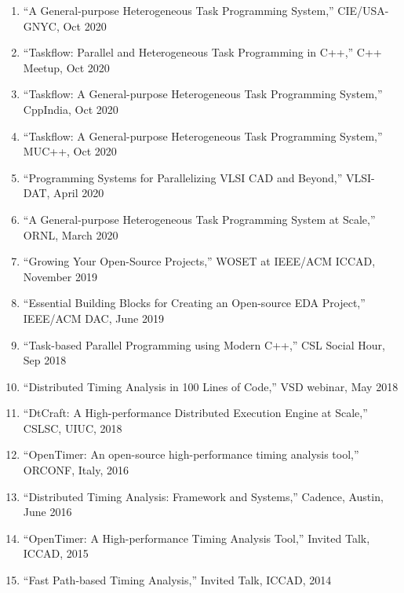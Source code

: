 \documentclass[A4,11pt]{article}
\begin{document}
\begin{enumerate}
  \item ``A General-purpose Heterogeneous Task Programming System,'' CIE/USA-GNYC, Oct 2020
  \item ``Taskflow: Parallel and Heterogeneous Task Programming in C++,'' C++ Meetup, Oct 2020
  \item ``Taskflow: A General-purpose Heterogeneous Task Programming System,'' CppIndia, Oct 2020
  \item ``Taskflow: A General-purpose Heterogeneous Task Programming System,'' MUC++, Oct 2020
  \item ``Programming Systems for Parallelizing VLSI CAD and Beyond,'' VLSI-DAT, April 2020
  \item ``A General-purpose Heterogeneous Task Programming System at Scale,'' ORNL, March 2020
  \item ``Growing Your Open-Source Projects,'' WOSET at IEEE/ACM ICCAD, November 2019
  \item ``Essential Building Blocks for Creating an Open-source EDA Project,'' IEEE/ACM DAC, June 2019
  \item ``Task-based Parallel Programming using Modern C++,'' CSL Social Hour, Sep 2018
  \item ``Distributed Timing Analysis in 100 Lines of Code,'' VSD webinar, May 2018
  \item ``DtCraft: A High-performance Distributed Execution Engine at Scale,'' CSLSC, UIUC, 2018
  \item ``OpenTimer: An open-source high-performance timing analysis tool,'' ORCONF, Italy, 2016
  \item ``Distributed Timing Analysis: Framework and Systems,'' Cadence, Austin, June 2016
  \item ``OpenTimer: A High-performance Timing Analysis Tool,'' Invited Talk, ICCAD, 2015
  \item ``Fast Path-based Timing Analysis,'' Invited Talk, ICCAD, 2014

 \end{enumerate}

\end{document}
